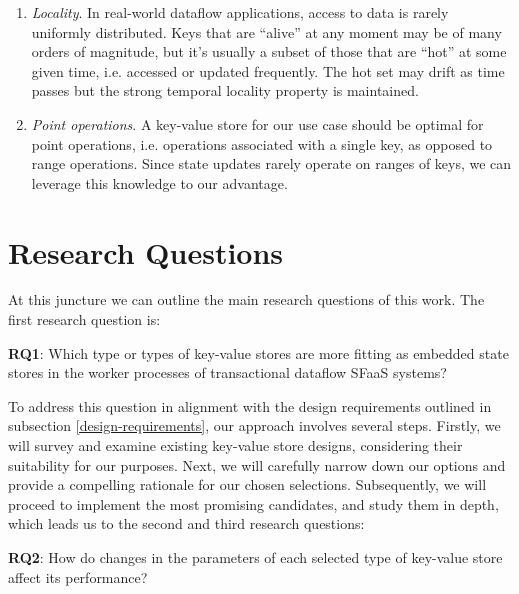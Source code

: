 \begin{enumerate}
    \item \textit{Locality}.
    In real-world dataflow applications, access to data is rarely uniformly distributed.
    Keys that are ``alive'' at any moment may be of many orders of magnitude, but it's usually a subset of those that are ``hot'' at some given time, i.e. accessed or updated frequently.
    The hot set may drift as time passes but the strong temporal locality property is maintained.

    \item \textit{Point operations}.
    A key-value store for our use case should be optimal for point operations, i.e. operations associated with a single key, as opposed to range operations.
    Since state updates rarely operate on ranges of keys, we can leverage this knowledge to our advantage.
\end{enumerate}

\section{Research Questions}
\label{section-reseach-questions}

At this juncture we can outline the main research questions of this work. The first research question is:\\

\begin{tcolorbox}
    \textbf{RQ1}: Which type or types of key-value stores are more fitting as embedded state stores in the worker processes of transactional dataflow SFaaS systems?
\end{tcolorbox}

\vspace{8px}
To address this question in alignment with the design requirements outlined in subsection \ref{design-requirements}, our approach involves several steps.
Firstly, we will survey and examine existing key-value store designs, considering their suitability for our purposes.
Next, we will carefully narrow down our options and provide a compelling rationale for our chosen selections.
Subsequently, we will proceed to implement the most promising candidates, and study them in depth, which leads us to the second and third research questions:\\

\begin{tcolorbox}
    \textbf{RQ2}: How do changes in the parameters of each selected type of key-value store affect its performance?
\end{tcolorbox}
\vspace{8px}

